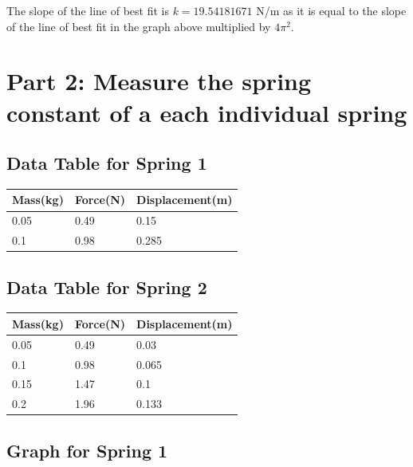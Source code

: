 \documentclass{report}
\begin{document}
The slope of the line of best fit is $k = 19.54181671 $ N/m as it is equal to the slope of the line of best fit in the graph above multiplied by $4\pi^2$.

\section*{Part 2: Measure the spring constant of a each individual spring}

\subsection*{Data Table for Spring 1}
\begin{table}[h!]
\begin{tabular}{|l|l|l|}
\hline
\textbf{Mass(kg)} & \textbf{Force(N)} & \textbf{Displacement(m)} \\ \hline
0.05              & 0.49              & 0.15                     \\ \hline
0.1               & 0.98              & 0.285                    \\ \hline
\end{tabular}
\end{table}

\subsection*{Data Table for Spring 2}

\begin{table}[h!]
\begin{tabular}{|l|l|l|}
\hline
\textbf{Mass(kg)} & \textbf{Force(N)} & \textbf{Displacement(m)} \\ \hline
0.05              & 0.49              & 0.03                     \\ \hline
0.1               & 0.98              & 0.065                    \\ \hline
0.15              & 1.47              & 0.1                      \\ \hline
0.2               & 1.96              & 0.133                    \\ \hline
\end{tabular}
\end{table}

\subsection*{Graph for Spring 1}
\end{document}
